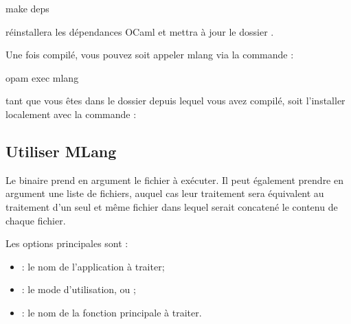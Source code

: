 \documentclass[letterpaper,10pt,french]{sphinxmanual}
\begin{document}
\begin{sphinxVerbatim}[commandchars=\\\{\}]
\PYGZdl{} make deps
\end{sphinxVerbatim}

\sphinxAtStartPar
réinstallera les dépendances OCaml et mettra à jour le dossier .

\sphinxAtStartPar
Une fois compilé, vous pouvez soit appeler mlang via la commande :

\begin{sphinxVerbatim}[commandchars=\\\{\}]
\PYGZdl{} opam exec \PYGZhy{}\PYGZhy{} mlang
\end{sphinxVerbatim}

\sphinxAtStartPar
tant que vous êtes dans le dossier depuis lequel vous avez compilé, soit
l’installer localement avec la commande :

\begin{sphinxVerbatim}[commandchars=\\\{\}]
  
\end{sphinxVerbatim}


\subsection{Utiliser MLang}
\label{\detokenize{mlang:utiliser-mlang}}
\sphinxAtStartPar
Le binaire  prend en argument le fichier  à exécuter.
Il peut également prendre en argument une liste de fichiers, auquel cas leur
traitement sera équivalent au traitement d’un seul et même fichier dans lequel
serait concatené le contenu de chaque fichier.

\sphinxAtStartPar
Les options principales sont :
\begin{itemize}
\item {} 
\sphinxAtStartPar
{}: le nom de l’application à traiter;

\item {} 
\sphinxAtStartPar
{}: le mode d’utilisation, ou ;

\item {} 
\sphinxAtStartPar
{}: le nom de la fonction principale à traiter.

\end{itemize}
\end{document}
